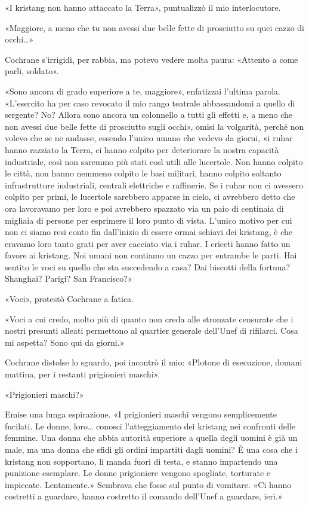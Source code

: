 «I kristang non hanno attaccato la Terra», puntualizzò il mio
interlocutore.

«Maggiore, a meno che tu non avessi due belle fette di prosciutto su
quei cazzo di occhi\ldots»

Cochrane s'irrigidì, per rabbia, ma potevo vedere molta paura: «Attento
a come parli, soldato».

«Sono ancora di grado superiore a te, maggiore», enfatizzai l'ultima
parola. «L'esercito ha per caso revocato il mio rango teatrale
abbassandomi a quello di sergente? No? Allora sono ancora un colonnello
a tutti gli effetti e, a meno che non avessi due belle fette di
prosciutto sugli occhi», omisi la volgarità, perché non volevo che se ne
andasse, essendo l'unico umano che vedevo da giorni, «i ruhar hanno
razziato la Terra, ci hanno colpito per deteriorare la nostra capacità
industriale, così non saremmo più stati così utili alle lucertole. Non
hanno colpito le città, non hanno nemmeno colpito le basi militari,
hanno colpito soltanto infrastrutture industriali, centrali elettriche e
raffinerie. Se i ruhar non ci avessero colpito per primi, le lucertole
sarebbero apparse in cielo, ci avrebbero detto che ora lavoravamo per
loro e poi avrebbero spazzato via un paio di centinaia di migliaia di
persone per esprimere il loro punto di vista. L'unico motivo per cui non
ci siamo resi conto fin dall'inizio di essere ormai schiavi dei
kristang, è che eravamo loro tanto grati per aver cacciato via i ruhar.
I criceti hanno fatto un favore ai kristang. Noi umani non contiamo un
cazzo per entrambe le parti. Hai sentito le voci su quello che sta
succedendo a casa? Dai biscotti della fortuna? Shanghai? Parigi? San
Francisco?»

«Voci», protestò Cochrane a fatica.

«Voci a cui credo, molto più di quanto non creda alle stronzate
censurate che i nostri presunti alleati permettono al quartier generale
dell'Unef di rifilarci. Cosa mi aspetta? Sono qui da giorni.»

Cochrane distolse lo sguardo, poi incontrò il mio: «Plotone di
esecuzione, domani mattina, per i restanti prigionieri maschi».

«Prigionieri maschi?»

Emise una lunga espirazione. «I prigionieri maschi vengono semplicemente
fucilati. Le donne, loro\ldots{} conosci l'atteggiamento dei kristang
nei confronti delle femmine. Una donna che abbia autorità superiore a
quella degli uomini è già un male, ma una donna che sfidi gli ordini
impartiti dagli uomini? È una cosa che i kristang non sopportano, li
manda fuori di testa, e stanno impartendo una punizione esemplare. Le
donne prigioniere vengono spogliate, torturate e impiccate. Lentamente.»
Sembrava che fosse sul punto di vomitare. «Ci hanno costretti a
guardare, hanno costretto il comando dell'Unef a guardare, ieri.»

